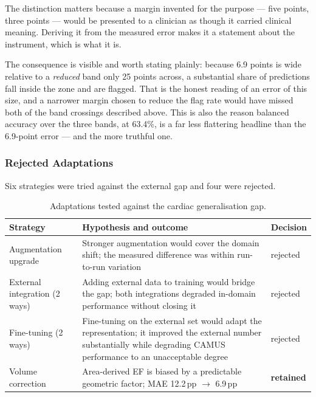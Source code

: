 The distinction matters because a margin invented for the purpose --- five points, three points
--- would be presented to a clinician as though it carried clinical meaning. Deriving it from
the measured error makes it a statement about the instrument, which is what it is.

The consequence is visible and worth stating plainly: because 6.9 points is wide relative to a
\emph{reduced} band only 25 points across, a substantial share of predictions fall inside the
zone and are flagged. That is the honest reading of an error of this size, and a narrower margin
chosen to reduce the flag rate would have missed both of the band crossings described above.
This is also the reason balanced accuracy over the three bands, at 63.4\%, is a far less
flattering headline than the 6.9-point error --- and the more truthful one.

\subsubsection{Rejected Adaptations}

Six strategies were tried against the external gap and four were rejected.

\begin{table}[H]
  \centering
  \small
  \caption{Adaptations tested against the cardiac generalisation gap.}
  \label{tab:cardiac-rejected}
  \begin{tabularx}{\textwidth}{@{}lXl@{}}
    \toprule
    Strategy & Hypothesis and outcome & Decision \\
    \midrule
    Augmentation upgrade & Stronger augmentation would cover the domain shift; the measured
      difference was within run-to-run variation & rejected \\
    External integration (2 ways) & Adding external data to training would bridge the gap; both
      integrations degraded in-domain performance without closing it & rejected \\
    Fine-tuning (2 ways) & Fine-tuning on the external set would adapt the representation; it
      improved the external number substantially while degrading CAMUS performance to an
      unacceptable degree & rejected \\
    Volume correction & Area-derived EF is biased by a predictable geometric factor; MAE
      12.2\,pp $\rightarrow$ 6.9\,pp & \textbf{retained} \\
    \bottomrule
  \end{tabularx}
\end{table}

